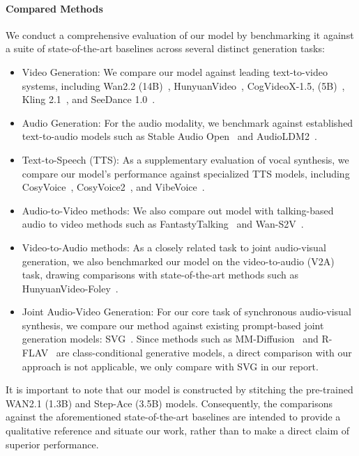 \paragraph{Compared Methods} We conduct a comprehensive evaluation of our model by benchmarking it against a suite of state-of-the-art baselines across several distinct generation tasks:
\begin{itemize}[leftmargin=*]
    \item Video Generation: We compare our model against leading text-to-video systems, including Wan2.2 (14B)~\cite{wan2025wan}, HunyuanVideo~\cite{kong2024hunyuanvideo}, CogVideoX-1.5, (5B)~\cite{yang2024cogvideox}, Kling 2.1~\cite{kuaishou2024kling}, and SeeDance 1.0~\cite{gao2025seedance}.
    \item Audio Generation: For the audio modality, we benchmark against established text-to-audio models such as Stable Audio Open~\cite{evans2025stable} and AudioLDM2~\cite{audioldm2-2024taslp}.
    \item Text-to-Speech (TTS): As a supplementary evaluation of vocal synthesis, we compare our model's performance against specialized TTS models, including CosyVoice~\cite{du2024cosyvoice}, CosyVoice2~\cite{du2024cosyvoice2}, and VibeVoice~\cite{peng2025vibevoice}.
    \item Audio-to-Video methods: We also compare out model with talking-based audio to video methods such as FantastyTalking~\cite{wang2025fantasytalking} and Wan-S2V~\cite{gao2025wan}.
    \item Video-to-Audio methods: As a closely related task to joint audio-visual generation, we also benchmarked our model on the video-to-audio (V2A) task, drawing comparisons with state-of-the-art methods such as HunyuanVideo-Foley~\cite{shan2025hunyuanvideo}.
    \item Joint Audio-Video Generation: For our core task of synchronous audio-visual synthesis, we compare our method against existing prompt-based joint generation models: SVG~\cite{ishii2024simple}. Since methods such as MM-Diffusion~\cite{ruan2023mm} and R-FLAV~\cite{ergasti2025r} are class-conditional generative models, a direct comparison with our approach is not applicable, we only compare with SVG in our report.
\end{itemize}
It is important to note that our model is constructed by stitching the pre-trained WAN2.1 (1.3B) and Step-Ace (3.5B) models. Consequently, the comparisons against the aforementioned state-of-the-art baselines are intended to provide a qualitative reference and situate our work, rather than to make a direct claim of superior performance.

